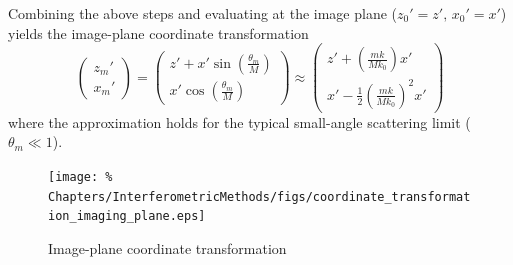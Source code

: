 Combining the above steps and
evaluating at the image plane ($z_0' = z', \, x_0' = x'$)
yields the image-plane coordinate transformation
\begin{equation}
  \begin{pmatrix}
    z_m' \\
    x_m'
  \end{pmatrix}
  =
  \begin{pmatrix}
    z' + x' \sin\left( \frac{\theta_m}{M} \right) \\
    x' \cos\left( \frac{\theta_m}{M} \right)
  \end{pmatrix}
  \approx
  \begin{pmatrix}
    z' + \left( \frac{m k}{M k_0} \right) x' \\
    x' - \frac{1}{2} \left( \frac{m k}{M k_0} \right)^2 x'
  \end{pmatrix}
  \label{eq:InterferometricMethods:coordinate_transformation_imaging_plane}
\end{equation}
where the approximation holds for
the typical small-angle scattering limit ($\theta_m \ll 1$).

\begin{figure}
  \centering
  \texttt{[image: \%
    Chapters/InterferometricMethods/figs/coordinate\_transformation\_imaging\_plane.eps]}
  \caption[Image-plane coordinate transformation]{%
    Image-plane coordinate transformation}
\label{fig:InterferometricMethods:coordinate_transformation_imaging_plane}
\end{figure}


